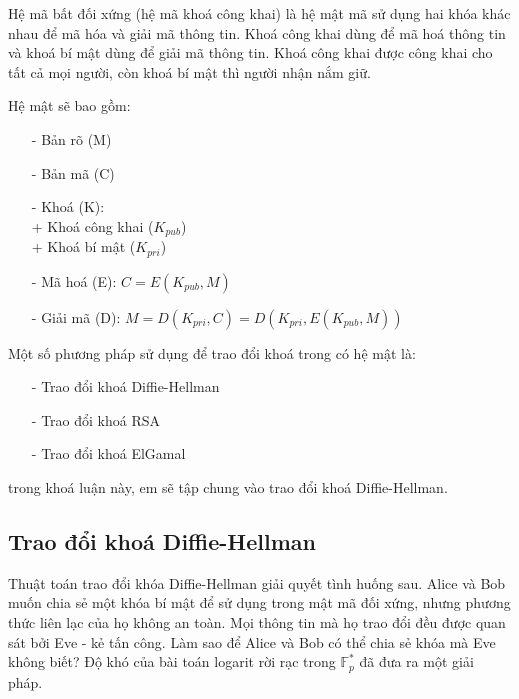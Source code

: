 Hệ mã bất đối xứng (hệ mã khoá công khai) là hệ mật mã sử dụng hai khóa khác nhau để mã hóa và giải mã thông tin.
Khoá công khai dùng để mã hoá thông tin và khoá bí mật dùng để giải mã thông tin. Khoá công khai được công khai 
cho tất cả mọi người, còn khoá bí mật thì người nhận nắm giữ.


Hệ mật sẽ bao gồm:
\begin{itemize}
    \item[-] Bản rõ (M)
    \item[-] Bản mã (C)
    \item[-] Khoá (K): 
        \\+ Khoá công khai ($K_{pub}$)
        \\+ Khoá bí mật ($K_{pri}$) 
    \item[-] Mã hoá (E): $C = E(K_{pub},M)$
    \item[-] Giải mã (D): $M = D(K_{pri},C) = D(K_{pri},E(K_{pub},M))$
\end{itemize}

Một số phương pháp sử dụng để trao đổi khoá trong có hệ mật là:
\begin{itemize}
    \item[-] Trao đổi khoá Diffie-Hellman
    \item[-] Trao đổi khoá RSA
    \item[-] Trao đổi khoá ElGamal
\end{itemize}

trong khoá luận này, em sẽ tập chung vào trao đổi khoá Diffie-Hellman.
\subsection{Trao đổi khoá Diffie-Hellman}

Thuật toán trao đổi khóa Diffie-Hellman giải quyết tình huống sau. Alice và
Bob muốn chia sẻ một khóa bí mật để sử dụng trong mật mã đối xứng, nhưng
phương thức liên lạc của họ không an toàn. Mọi thông tin mà họ trao
đổi đều được quan sát bởi Eve - kẻ tấn công. Làm sao để Alice và Bob có
thể chia sẻ khóa mà Eve không biết? Độ khó của bài toán logarit rời
rạc trong $\mathbb{F}^*_p$ đã đưa ra một giải pháp.



